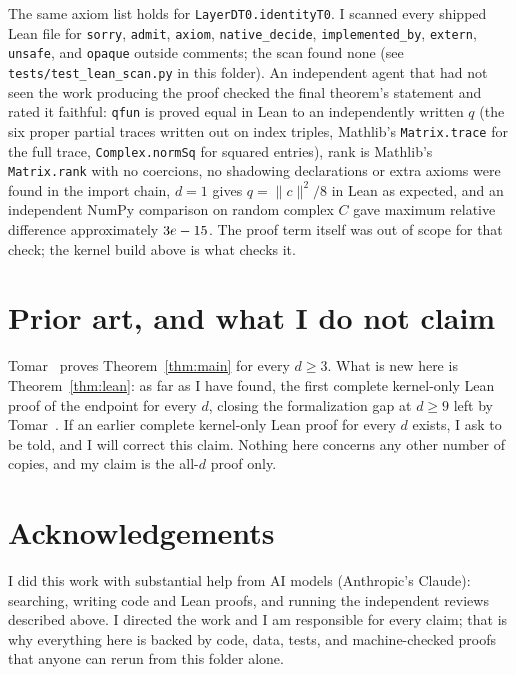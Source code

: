 \documentclass[11pt]{article}
\theoremstyle{remark}
\begin{document}
The same axiom list holds for \texttt{LayerDT0.identityT0}.
I scanned every shipped Lean file for \texttt{sorry}, \texttt{admit},
\texttt{axiom}, \texttt{native\_decide}, \texttt{implemented\_by},
\texttt{extern}, \texttt{unsafe}, and \texttt{opaque} outside comments;
the scan found none (see \texttt{tests/test\_lean\_scan.py} in this folder).
An independent agent that had not seen the work producing the proof
checked the final theorem's statement and rated it faithful:
\texttt{qfun} is proved equal in Lean to an independently written $q$
(the six proper partial traces written out on index triples, Mathlib's
\texttt{Matrix.trace} for the full trace, \texttt{Complex.normSq} for
squared entries), rank is Mathlib's \texttt{Matrix.rank} with no
coercions, no shadowing declarations or extra axioms were found in the
import chain, $d = 1$ gives $q = \lVert c \rVert^2/8$ in Lean as expected,
and an independent NumPy comparison on random complex $C$ gave maximum
relative difference approximately $3e-15{}$.
The proof term itself was out of scope for that check; the kernel build
above is what checks it.

\section{Prior art, and what I do not claim}

Tomar~\cite{tomar2026} proves Theorem~\ref{thm:main} for every $d \ge 3$.
What is new here is Theorem~\ref{thm:lean}: as far as I have found, the
first complete kernel-only Lean proof of the endpoint for every $d$,
closing the formalization gap at $d \ge 9$ left by Tomar~\cite{tomar2026}.
If an earlier complete kernel-only Lean proof for every $d$ exists,
I ask to be told, and I will correct this claim.
Nothing here concerns any other number of copies, and my claim is the
all-$d$ proof only.

\section*{Acknowledgements}

I did this work with substantial help from AI models
(Anthropic's Claude): searching, writing code and Lean proofs, and
running the independent reviews described above.
I directed the work and I am responsible for every claim;
that is why everything here is backed by code, data, tests, and
machine-checked proofs that anyone can rerun from this folder alone.



\end{document}
